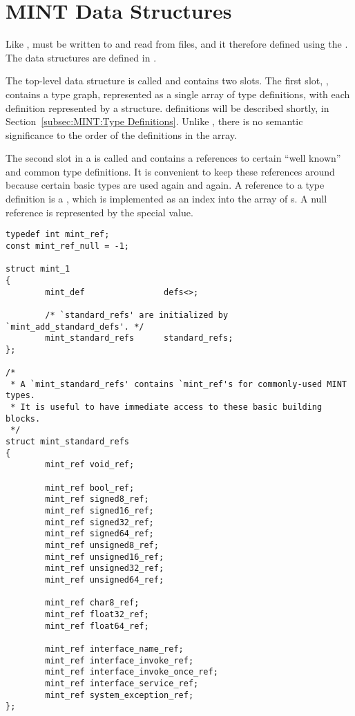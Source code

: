 

\section{MINT Data Structures}
\label{sec:MINT:MINT Data Structures}

Like \AOI{}, \MINT{} must be written to and read from files, and it therefore
defined using the \ONCRPC{} \IDL{}\@.  The data structures are defined in
.

The top-level \MINT{} data structure is called  and contains two
slots.  The first slot, , contains a \MINT{} type graph, represented
as a single array of type definitions, with each definition represented by a
 structure.  \MINT{} definitions will be described shortly, in
Section~\ref{subsec:MINT:Type Definitions}.  Unlike \AOI{}, there is no
semantic significance to the order of the definitions in the array.

The second slot in a  is called  and contains a
references to certain ``well known'' and common \MINT{} type definitions.  It
is convenient to keep these references around because certain basic types are
used again and again.  A reference to a \MINT{} type definition is a
, which is implemented as an index into the  array of
s.  A null reference is represented by the special
 value.

\begin{verbatim}
typedef int mint_ref;
const mint_ref_null = -1;

struct mint_1
{
        mint_def                defs<>;

        /* `standard_refs' are initialized by `mint_add_standard_defs'. */
        mint_standard_refs      standard_refs;
};

/*
 * A `mint_standard_refs' contains `mint_ref's for commonly-used MINT types.
 * It is useful to have immediate access to these basic building blocks.
 */
struct mint_standard_refs
{
        mint_ref void_ref;

        mint_ref bool_ref;
        mint_ref signed8_ref;
        mint_ref signed16_ref;
        mint_ref signed32_ref;
        mint_ref signed64_ref;
        mint_ref unsigned8_ref;
        mint_ref unsigned16_ref;
        mint_ref unsigned32_ref;
        mint_ref unsigned64_ref;

        mint_ref char8_ref;
        mint_ref float32_ref;
        mint_ref float64_ref;

        mint_ref interface_name_ref;
        mint_ref interface_invoke_ref;
        mint_ref interface_invoke_once_ref;
        mint_ref interface_service_ref;
        mint_ref system_exception_ref;
};
\end{verbatim}

